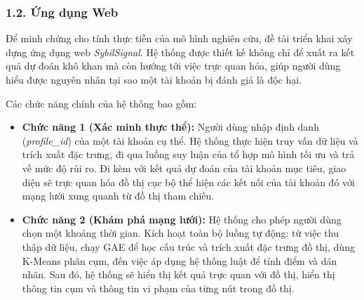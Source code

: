 \subsubsection{1.2. Ứng dụng Web}
\indent\indent Để minh chứng cho tính thực tiễn của mô hình nghiên cứu, đề tài triển khai xây dựng ứng dụng web \textit{SybilSignal}. Hệ thống được thiết kế không chỉ để xuất ra kết quả dự đoán khô khan mà còn hướng tới việc trực quan hóa, giúp người dùng hiểu được nguyên nhân tại sao một tài khoản bị đánh giá là độc hại.\vspace{0.3cm}

Các chức năng chính của hệ thống bao gồm:\vspace{-0.1cm}
\begin{itemize}[label={--}, itemsep=1pt]
    \item \textbf{Chức năng 1 (Xác minh thực thể):} Người dùng nhập định danh (\textit{profile\_id}) của một tài khoản cụ thể. Hệ thống thực hiện truy vấn dữ liệu và trích xuất đặc trưng, đi qua luồng suy luận của tổ hợp mô hình tối ưu và trả về mức độ rủi ro. Đi kèm với kết quả dự đoán của tài khoản mục tiêu, giao diện sẽ trực quan hóa đồ thị cục bộ thể hiện các kết nối của tài khoản đó với mạng lưới xung quanh từ đồ thị tham chiếu.
    \item \textbf{Chức năng 2 (Khám phá mạng lưới):} Hệ thống cho phép người dùng chọn một khoảng thời gian. Kích hoạt toàn bộ luồng tự động: từ việc thu thập dữ liệu, chạy GAE để học cấu trúc và trích xuất đặc trưng đồ thị, dùng K-Means phân cụm, đến việc áp dụng hệ thống luật để tính điểm và dán nhãn. Sau đó, hệ thống sẽ hiển thị kết quả trực quan với đồ thị, hiển thị thông tin cụm và thông tin vi phạm của từng nút trong đồ thị.
\end{itemize}